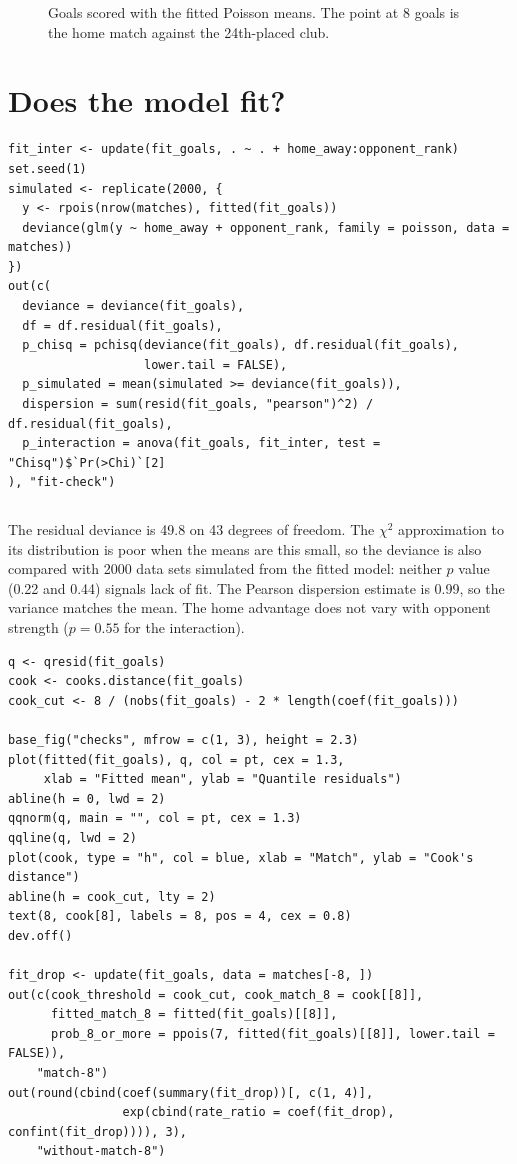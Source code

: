 \documentclass[12pt,notitlepage]{report}
\begin{document}
\begin{figure}[H]
  \centering
  \caption{Goals scored with the fitted Poisson means. The point at 8 goals
    is the home match against the 24th-placed club.}
  \label{fig:fitted}
\end{figure}

\section{Does the model fit?}

\begin{verbatim}
fit_inter <- update(fit_goals, . ~ . + home_away:opponent_rank)
set.seed(1)
simulated <- replicate(2000, {
  y <- rpois(nrow(matches), fitted(fit_goals))
  deviance(glm(y ~ home_away + opponent_rank, family = poisson, data = matches))
})
out(c(
  deviance = deviance(fit_goals),
  df = df.residual(fit_goals),
  p_chisq = pchisq(deviance(fit_goals), df.residual(fit_goals),
                   lower.tail = FALSE),
  p_simulated = mean(simulated >= deviance(fit_goals)),
  dispersion = sum(resid(fit_goals, "pearson")^2) / df.residual(fit_goals),
  p_interaction = anova(fit_goals, fit_inter, test = "Chisq")$`Pr(>Chi)`[2]
), "fit-check")
\end{verbatim}

\inputminted{text}{output/fit-check.txt}

The residual deviance is 49.8 on 43 degrees of freedom. The $\chi^2$
approximation to its distribution is poor when the means are this small, so
the deviance is also compared with 2000 data sets simulated from the fitted
model: neither $p$ value (0.22 and 0.44) signals lack of fit. The Pearson
dispersion estimate is 0.99, so the variance matches the mean. The home
advantage does not vary with opponent strength ($p = 0.55$ for the
interaction).

\begin{verbatim}
q <- qresid(fit_goals)
cook <- cooks.distance(fit_goals)
cook_cut <- 8 / (nobs(fit_goals) - 2 * length(coef(fit_goals)))

base_fig("checks", mfrow = c(1, 3), height = 2.3)
plot(fitted(fit_goals), q, col = pt, cex = 1.3,
     xlab = "Fitted mean", ylab = "Quantile residuals")
abline(h = 0, lwd = 2)
qqnorm(q, main = "", col = pt, cex = 1.3)
qqline(q, lwd = 2)
plot(cook, type = "h", col = blue, xlab = "Match", ylab = "Cook's distance")
abline(h = cook_cut, lty = 2)
text(8, cook[8], labels = 8, pos = 4, cex = 0.8)
dev.off()

fit_drop <- update(fit_goals, data = matches[-8, ])
out(c(cook_threshold = cook_cut, cook_match_8 = cook[[8]],
      fitted_match_8 = fitted(fit_goals)[[8]],
      prob_8_or_more = ppois(7, fitted(fit_goals)[[8]], lower.tail = FALSE)),
    "match-8")
out(round(cbind(coef(summary(fit_drop))[, c(1, 4)],
                exp(cbind(rate_ratio = coef(fit_drop), confint(fit_drop)))), 3),
    "without-match-8")
\end{verbatim}
\end{document}
